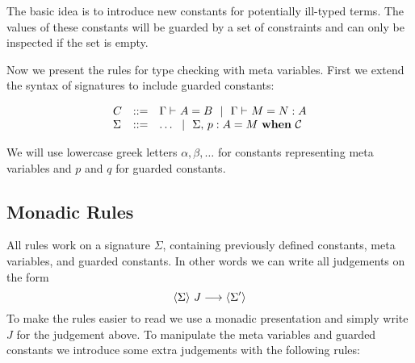 
The basic idea is to introduce new constants for potentially ill-typed terms.  
The values of these constants will be guarded by a set of constraints and can
only be inspected if the set is empty.

Now we present the rules for type checking with meta variables. First we extend
the syntax of signatures to include guarded constants:

\[\begin{array}{lcll}
    C & ::= & {\Gamma} \vdash_{}A=B ~~|~~ {\Gamma} \vdash_{}M=N:A \\
    \Sigma & ::= & \ldots ~~|~~
		{\Sigma},\,{} {p} : {A} = {M} ~\mathbf{when}~ {\mathcal{C}} \\
\end{array}\]

We will use lowercase greek letters $\alpha, \beta, \ldots$ for constants
representing meta variables and $p$ and $q$ for guarded constants.

\subsection{Monadic Rules}

All rules work on a signature $\Sigma$, containing previously defined
constants, meta variables, and guarded constants.
%
In other words we can write all judgements on the form
\[\langle {\Sigma} \rangle ~{J} \longrightarrow \langle {\Sigma'} \rangle\]
%
To make the rules easier to read we use a monadic presentation and simply write
$J$ for the judgement above.
%
To manipulate the meta variables and guarded constants we introduce some extra
judgements with the following rules:





